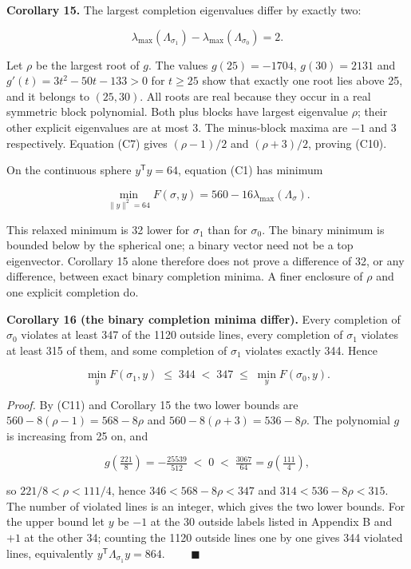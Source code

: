 \documentclass[11pt,a4paper]{article}
\newcommand{\lt}{<}
\newcommand{\gt}{>}
\begin{document}
\textbf{Corollary 15.} The largest completion eigenvalues differ by exactly two:

\[\lambda_{\max}(\Lambda_{\sigma_1})-
\lambda_{\max}(\Lambda_{\sigma_0})=2.
\tag{C10}\]

Let \(\rho\) be the largest root of \(g\). The values \(g(25)=-1704\), \(g(30)=2131\) and
\(g'(t)=3t^2-50t-133\gt 0\) for \(t\ge25\) show that exactly one root lies above 25, and it belongs to
\((25,30)\). All roots are real because they occur in a real symmetric block polynomial. Both plus
blocks have largest eigenvalue \(\rho\); their other explicit eigenvalues are at most 3. The minus-block
maxima are \(-1\) and \(3\) respectively. Equation (C7) gives \((\rho-1)/2\) and \((\rho+3)/2\), proving
(C10).

On the continuous sphere \(y^{\mathsf T}y=64\), equation (C1) has minimum

\[\min_{\|y\|^2=64}F(\sigma,y)=560-16\lambda_{\max}(\Lambda_\sigma).
\tag{C11}\]

This relaxed minimum is 32 lower for \(\sigma_1\) than for \(\sigma_0\). The binary minimum is bounded
below by the spherical one; a binary vector need not be a top eigenvector. Corollary 15 alone
therefore does not prove a difference of 32, or any difference, between exact binary completion
minima. A finer enclosure of \(\rho\) and one explicit completion do.

\textbf{Corollary 16 (the binary completion minima differ).} Every completion of \(\sigma_0\) violates at
least 347 of the 1120 outside lines, every completion of \(\sigma_1\) violates at least 315 of them, and
some completion of \(\sigma_1\) violates exactly 344. Hence

\[\min_y F(\sigma_1,y)\;\le\;344\;<\;347\;\le\;\min_y F(\sigma_0,y).
\tag{C12}\]

\emph{Proof.} By (C11) and Corollary 15 the two lower bounds are \(560-8(\rho-1)=568-8\rho\) and
\(560-8(\rho+3)=536-8\rho\). The polynomial \(g\) is increasing from 25 on, and

\[g\!\left(\tfrac{221}{8}\right)=-\tfrac{25539}{512}\;<\;0\;<\;\tfrac{3067}{64}=g\!\left(\tfrac{111}{4}\right),\]

so \(221/8\lt\rho\lt111/4\), hence \(346\lt568-8\rho\lt347\) and \(314\lt536-8\rho\lt315\). The number of
violated lines is an integer, which gives the two lower bounds. For the upper bound let \(y\) be \(-1\) at
the 30 outside labels listed in Appendix B and \(+1\) at the other 34; counting the 1120 outside lines
one by one gives 344 violated lines, equivalently \(y^{\mathsf T}\Lambda_{\sigma_1}y=864\).
\(\qquad\blacksquare\)
\end{document}
